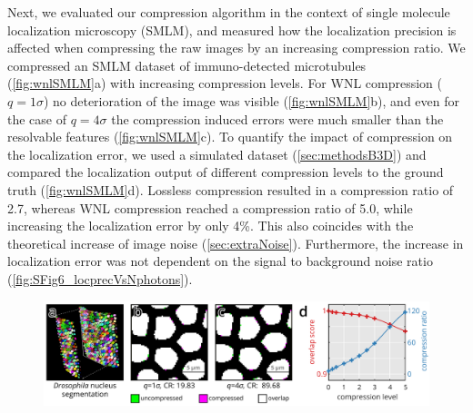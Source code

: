     Next, we evaluated our compression algorithm in the context of single molecule localization microscopy (SMLM), and measured how the localization precision is affected when compressing the raw images by an increasing compression ratio. We compressed an SMLM dataset of immuno-detected microtubules (\autoref{fig:wnlSMLM}a) with increasing compression levels. For WNL compression ($q=1\sigma$) no deterioration of the image was visible (\autoref{fig:wnlSMLM}b), and even for the case of $q=4\sigma$ the compression induced errors were much smaller than the resolvable features (\autoref{fig:wnlSMLM}c). To quantify the impact of compression on the localization error, we used a simulated dataset (\autoref{sec:methodsB3D}) and compared the localization output of different compression levels to the ground truth (\autoref{fig:wnlSMLM}d). Lossless compression resulted in a compression ratio of 2.7, whereas WNL compression reached a compression ratio of 5.0, while increasing the localization error by only 4\%. This also coincides with the theoretical increase of image noise (\autoref{sec:extraNoise}). Furthermore, the increase in localization error was not dependent on the signal to background noise ratio (\autoref{fig:SFig6_locprecVsNphotons}).

    \begin{figure}[tpb]
      \centering
      \includegraphics[page=2,width=1\textwidth]{LLvsB3D}
      \label{fig:wnlSMLM}
    \end{figure}

